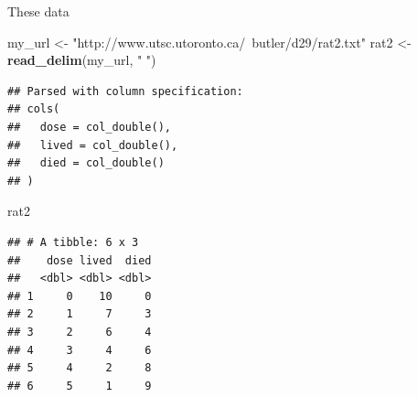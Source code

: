 \documentclass[ignorenonframetext,]{beamer}
\newenvironment{Shaded}{\begin{snugshade}}{\end{snugshade}}
\newcommand{\KeywordTok}[1]{\textcolor[rgb]{0.13,0.29,0.53}{\textbf{#1}}}
\newcommand{\NormalTok}[1]{#1}
\newcommand{\StringTok}[1]{\textcolor[rgb]{0.31,0.60,0.02}{#1}}
\begin{document}
\begin{frame}[fragile]{These data}
\protect\hypertarget{these-data}{}

\footnotesize

\begin{Shaded}
\begin{Highlighting}[]
\NormalTok{my_url <-}\StringTok{ "http://www.utsc.utoronto.ca/~butler/d29/rat2.txt"}
\NormalTok{rat2 <-}\StringTok{ }\KeywordTok{read_delim}\NormalTok{(my_url, }\StringTok{" "}\NormalTok{)}
\end{Highlighting}
\end{Shaded}

\begin{verbatim}
## Parsed with column specification:
## cols(
##   dose = col_double(),
##   lived = col_double(),
##   died = col_double()
## )
\end{verbatim}

\begin{Shaded}
\begin{Highlighting}[]
\NormalTok{rat2}
\end{Highlighting}
\end{Shaded}

\begin{verbatim}
## # A tibble: 6 x 3
##    dose lived  died
##   <dbl> <dbl> <dbl>
## 1     0    10     0
## 2     1     7     3
## 3     2     6     4
## 4     3     4     6
## 5     4     2     8
## 6     5     1     9
\end{verbatim}

\normalsize

\end{frame}
\end{document}
